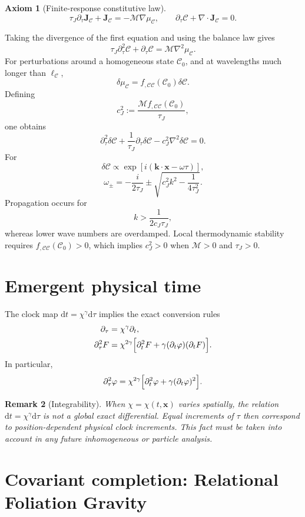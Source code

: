 \documentclass[11pt,a4paper]{article}
\newtheorem{axiom}{Axiom}[section]
\newtheorem{remark}[axiom]{Remark}
\newcommand{\C}{\mathcal{C}}
\newcommand{\Jc}{\mathbf{J}_{\mathcal{C}}}
\renewcommand{\dd}{\mathrm{d}}
\begin{document}
\begin{axiom}[Finite-response constitutive law]
\[
\tau_J\partial_\tau\Jc+\Jc=-\mathcal M\nabla\mu_{\mathcal C},
\qquad
\partial_\tau\C+\nabla\cdot\Jc=0.
\]
\end{axiom}

Taking the divergence of the first equation and using the balance law gives
\[
\boxed{
\tau_J\partial_\tau^2\C+\partial_\tau\C
=
\mathcal M\nabla^2\mu_{\mathcal C}.
}
\]
For perturbations around a homogeneous state \(\C_0\), and at wavelengths much
longer than \(\ell_{\mathcal C}\),
\[
\delta\mu_{\mathcal C}
=
f_{,\C\C}(\C_0)\delta\C.
\]
Defining
\[
c_J^2
:=
\frac{\mathcal M f_{,\C\C}(\C_0)}{\tau_J},
\]
one obtains
\[
\partial_\tau^2\delta\C
+\frac{1}{\tau_J}\partial_\tau\delta\C
-c_J^2\nabla^2\delta\C=0.
\]
For
\[
\delta\C\propto
\exp\!\left[i(\mathbf k\cdot\mathbf x-\omega\tau)\right],
\]
\[
\omega_\pm
=
-\frac{i}{2\tau_J}
\pm
\sqrt{c_J^2k^2-\frac{1}{4\tau_J^2}}.
\]
Propagation occurs for
\[
k>\frac{1}{2c_J\tau_J},
\]
whereas lower wave numbers are overdamped. Local thermodynamic stability
requires \(f_{,\C\C}(\C_0)>0\), which implies \(c_J^2>0\) when
\(\mathcal M>0\) and \(\tau_J>0\).

\section{Emergent physical time}

The clock map \(\dd t=\chi^\gamma\dd\tau\) implies the exact conversion rules
\begin{align}
\partial_\tau&=\chi^\gamma\partial_t,\\
\partial_\tau^2F&=\chi^{2\gamma}\Bigl[\partial_t^2F+\gamma(\partial_t\varphi)(\partial_tF)\Bigr].
\end{align}
In particular,
\[
\partial_\tau^2\varphi=\chi^{2\gamma}\Bigl[\partial_t^2\varphi+\gamma(\partial_t\varphi)^2\Bigr].
\]

\begin{remark}[Integrability]
When \(\chi=\chi(t,\mathbf{x})\) varies spatially, the relation \(\dd t=\chi^\gamma\dd\tau\) is not a global exact differential. Equal increments of \(\tau\) then correspond to position-dependent physical clock increments. This fact must be taken into account in any future inhomogeneous or particle analysis.
\end{remark}

\section{Covariant completion: Relational Foliation Gravity}
\end{document}
